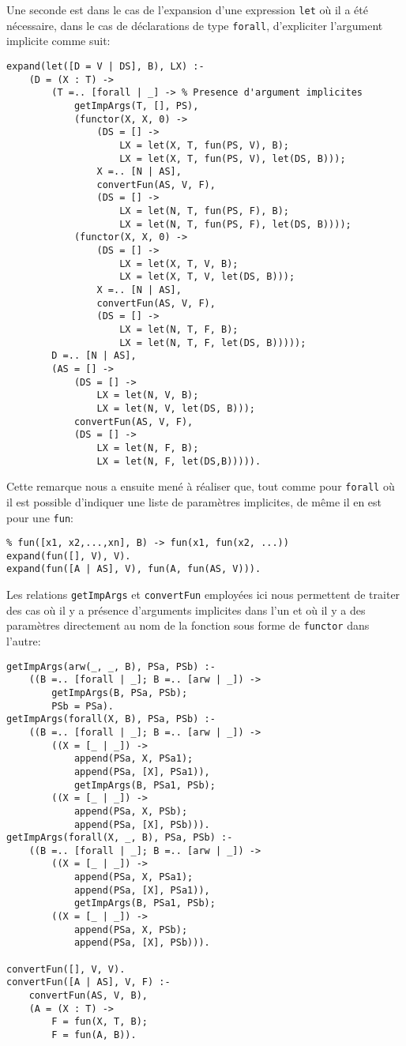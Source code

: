 \documentclass[12pt, titlepage]{article}
\begin{document}
Une seconde est dans le cas de l'expansion d'une expression \texttt{let} où il
a été nécessaire, dans le cas de déclarations de type \texttt{forall},
d'expliciter l'argument implicite comme suit:
\begin{lstlisting}
expand(let([D = V | DS], B), LX) :-
    (D = (X : T) ->
        (T =.. [forall | _] -> % Presence d'argument implicites
            getImpArgs(T, [], PS),
            (functor(X, X, 0) ->
                (DS = [] ->
                    LX = let(X, T, fun(PS, V), B);
                    LX = let(X, T, fun(PS, V), let(DS, B)));
                X =.. [N | AS],
                convertFun(AS, V, F),
                (DS = [] ->
                    LX = let(N, T, fun(PS, F), B);
                    LX = let(N, T, fun(PS, F), let(DS, B))));
            (functor(X, X, 0) ->
                (DS = [] ->
                    LX = let(X, T, V, B);
                    LX = let(X, T, V, let(DS, B)));
                X =.. [N | AS],
                convertFun(AS, V, F),
                (DS = [] ->
                    LX = let(N, T, F, B);
                    LX = let(N, T, F, let(DS, B)))));
        D =.. [N | AS],
        (AS = [] ->
            (DS = [] ->
                LX = let(N, V, B);
                LX = let(N, V, let(DS, B)));
            convertFun(AS, V, F),
            (DS = [] ->
                LX = let(N, F, B);
                LX = let(N, F, let(DS,B))))).
\end{lstlisting}

Cette remarque nous a ensuite mené à réaliser que, tout comme pour
\texttt{forall} où il est possible d'indiquer une liste de paramètres
implicites, de même il en est pour une \texttt{fun}:
\begin{lstlisting}
% fun([x1, x2,...,xn], B) -> fun(x1, fun(x2, ...))
expand(fun([], V), V).
expand(fun([A | AS], V), fun(A, fun(AS, V))).
\end{lstlisting}

Les relations \texttt{getImpArgs} et \texttt{convertFun} employées ici nous
permettent de traiter des cas où il y a présence d'arguments implicites dans
l'un et où il y a des paramètres directement au nom de la fonction sous forme
de \texttt{functor} dans l'autre:
\begin{lstlisting}
getImpArgs(arw(_, _, B), PSa, PSb) :-
    ((B =.. [forall | _]; B =.. [arw | _]) ->
        getImpArgs(B, PSa, PSb);
        PSb = PSa).
getImpArgs(forall(X, B), PSa, PSb) :-
    ((B =.. [forall | _]; B =.. [arw | _]) ->
        ((X = [_ | _]) ->
            append(PSa, X, PSa1);
            append(PSa, [X], PSa1)),
            getImpArgs(B, PSa1, PSb);
        ((X = [_ | _]) ->
            append(PSa, X, PSb);
            append(PSa, [X], PSb))).
getImpArgs(forall(X, _, B), PSa, PSb) :-
    ((B =.. [forall | _]; B =.. [arw | _]) ->
        ((X = [_ | _]) ->
            append(PSa, X, PSa1);
            append(PSa, [X], PSa1)),
            getImpArgs(B, PSa1, PSb);
        ((X = [_ | _]) ->
            append(PSa, X, PSb);
            append(PSa, [X], PSb))).

convertFun([], V, V).
convertFun([A | AS], V, F) :-
    convertFun(AS, V, B),
    (A = (X : T) ->
        F = fun(X, T, B);
        F = fun(A, B)).
\end{lstlisting}
\end{document}
